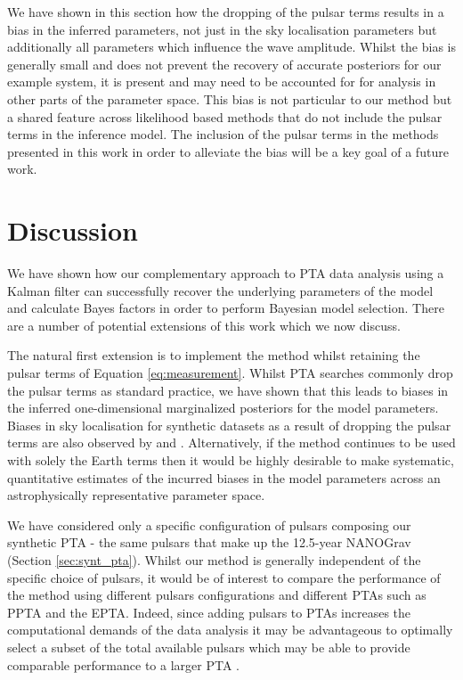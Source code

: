 \documentclass[fleqn,usenatbib,useAMS]{mnras}
\begin{document}
We have shown in this section how the dropping of the pulsar terms results in a bias in the inferred parameters, not just in the sky localisation parameters  \citep[e.g.][]{Zhupulsarterms,Chen2022} but additionally all parameters which influence the wave amplitude. Whilst the bias is generally small and does not prevent the recovery of accurate posteriors for our example system, it is present and may need to be accounted for for analysis in other parts of the parameter space. This bias is not particular to our method but a shared feature across likelihood based methods that do not include the pulsar terms in the inference model. The inclusion of the pulsar terms in the methods presented in this work in order to alleviate the bias will be a key goal of a future work. 


\section{Discussion}\label{sec:discussion}
We have shown how our complementary approach to PTA data analysis using a Kalman filter can successfully recover the underlying parameters of the model and calculate Bayes factors in order to perform Bayesian model selection. There are a number of potential extensions of this work which we now discuss.  \newline 

The natural first extension is to implement the method whilst retaining the pulsar terms of Equation \ref{eq:measurement}. Whilst PTA searches commonly drop the pulsar terms as standard practice, we have shown that this leads to biases in the inferred one-dimensional marginalized posteriors for the model parameters. Biases in sky localisation for synthetic datasets as a result of dropping the pulsar terms are also observed by \cite{Zhupulsarterms} and \cite{Chen2022}. Alternatively, if the method continues to be used with solely the Earth terms then it would be highly desirable to make systematic, quantitative estimates of the incurred biases in the model parameters across an astrophysically representative parameter space. \newline 

We have considered only a specific configuration of pulsars composing our synthetic PTA - the same pulsars that make up the 12.5-year NANOGrav (Section \ref{sec:synt_pta}). Whilst our method is generally independent of the specific choice of pulsars, it would be of interest to compare the performance of the method using different pulsars configurations and different PTAs such as PPTA and the EPTA. Indeed, since adding pulsars to PTAs increases the computational demands of the data analysis it may be advantageous to optimally select a subset of the total available pulsars which may be able to provide comparable performance to a larger PTA  \citep{2023MNRAS.518.1802S}.  \newline 
\end{document}
